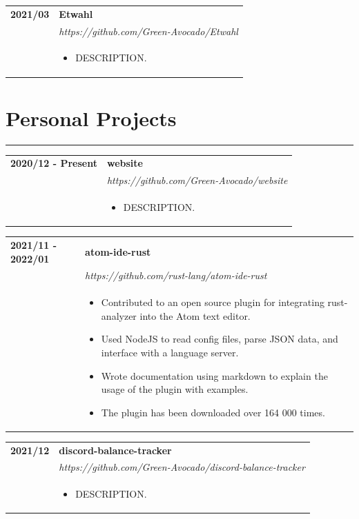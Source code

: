 \documentclass[letterpaper]{article}
\newcommand{\sect}[1]{\section*{#1}
                        {\color{cyan}
                        \rule{\textwidth}{1pt}
                        \vspace{-1ex}}}
\begin{document}
        \begin{tabular}{p{} p{}}
            \textbf{2021/03} & \textbf{Etwahl} \\
            & \emph{https://github.com/Green-Avocado/Etwahl} \\
            & \begin{itemize}
                \item DESCRIPTION.
            \end{itemize}
            \\
        \end{tabular}

    \sect{Personal Projects}

        \begin{tabular}{p{} p{}}
            \textbf{2020/12 - Present} & \textbf{website} \\
            & \emph{https://github.com/Green-Avocado/website} \\
            & \begin{itemize}
                \item DESCRIPTION.
            \end{itemize}
            \\
        \end{tabular}

        \begin{tabular}{p{} p{}}
            \textbf{2021/11 - 2022/01} & \textbf{atom-ide-rust} \\
            & \emph{https://github.com/rust-lang/atom-ide-rust} \\
            & \begin{itemize}
                \item Contributed to an open source plugin for integrating rust-analyzer into the Atom text editor.
                \item Used NodeJS to read config files, parse JSON data, and interface with a language server.
                \item Wrote documentation using markdown to explain the usage of the plugin with examples.
                \item The plugin has been downloaded over 164 000 times.
            \end{itemize}
            \\
        \end{tabular}

        \begin{tabular}{p{} p{}}
            \textbf{2021/12} & \textbf{discord-balance-tracker} \\
            & \emph{https://github.com/Green-Avocado/discord-balance-tracker} \\
            & \begin{itemize}
                \item DESCRIPTION.
            \end{itemize}
            \\
        \end{tabular}
\end{document}
